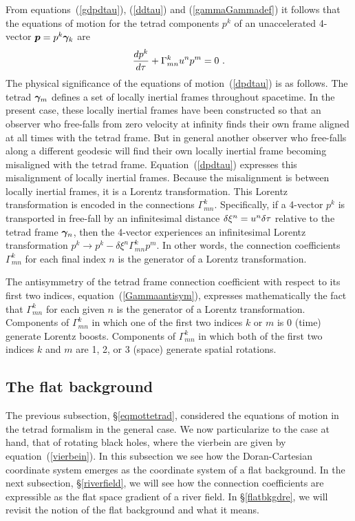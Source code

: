 \documentclass[twocolumn,showpacs,preprintnumbers,amsmath,amssymb,prb]{revtex4}
\begin{document}
From equations~(\ref{gdpdtau}), (\ref{ddtau}) and (\ref{gammaGammadef})
it follows that the equations of motion for the tetrad components $p^k$
of an unaccelerated 4-vector $\bm{p} = p^k \bm{\gamma}_k$ are
\begin{equation}
\label{dpdtau}
  {dp^k \over d\tau} + \Gamma^k_{mn} u^n p^m = 0
  \ .
\end{equation}
The physical significance of the equations of motion~(\ref{dpdtau})
is as follows.
The tetrad $\bm{\gamma}_m$ defines a set of locally inertial
frames throughout spacetime.
In the present case,
these locally inertial frames have been constructed so that
an observer who free-falls from zero velocity at infinity
finds their own frame aligned at all times with the tetrad frame.
But in general another observer who free-falls along a different
geodesic will find their own locally inertial frame becoming misaligned
with the tetrad frame.
Equation~(\ref{dpdtau})
expresses this misalignment of locally inertial frames.
Because the misalignment is between locally inertial frames,
it is a Lorentz transformation.
This Lorentz transformation is encoded in the connections
$\Gamma^k_{mn}$.
Specifically,
if a 4-vector $p^k$ is transported in free-fall
by an infinitesimal distance $\delta \xi^n = u^n \delta \tau$
relative to the tetrad frame $\bm{\gamma}_n$,
then the 4-vector experiences an infinitesimal Lorentz transformation
$p^k \rightarrow p^k - \delta \xi^n \Gamma^k_{mn} p^m$.
In other words,
the connection coefficients $\Gamma^k_{mn}$
for each final index $n$
is the generator of a Lorentz transformation.

The antisymmetry of the tetrad frame connection coefficient
with respect to its first two indices,
equation~(\ref{Gammaantisym}),
expresses mathematically
the fact that $\Gamma^k_{mn}$ for each given $n$
is the generator of a Lorentz transformation.
Components of $\Gamma^k_{mn}$
in which one of the first two indices $k$ or $m$ is 0 (time)
generate Lorentz boosts.
Components of $\Gamma^k_{mn}$
in which both of the first two indices $k$ and $m$ are 1, 2, or 3 (space)
generate spatial rotations.

\subsection{The flat background}
\label{flatbkgd}

The previous subsection, \S\ref{eqmottetrad},
considered the equations of motion in the tetrad formalism in the general case.
We now particularize to the case at hand,
that of rotating black holes,
where the vierbein are given by equation~(\ref{vierbein}).
In this subsection
we see how the Doran-Cartesian coordinate system
emerges as the coordinate system of a flat background.
In the next subsection, \S\ref{riverfield},
we will see how the connection coefficients
are expressible as the flat space gradient of a river field.
In \S\ref{flatbkgdre},
we will revisit the notion of the flat background and what it means.
\end{document}
